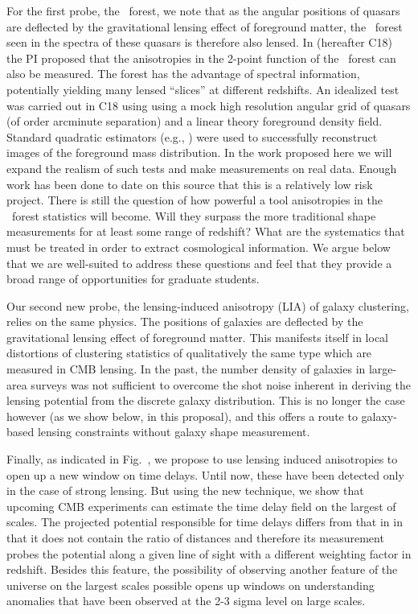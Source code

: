 For the first probe, the \lya\ forest, we note that as the angular 
positions of quasars are deflected by the 
gravitational lensing effect of foreground matter, the \lya\ forest 
seen in the spectra of these quasars is 
therefore also lensed.
In \cite{croft17} (hereafter C18)
 the PI proposed that the 
anisotropies in the 2-point function of the \lya\ forest
can also be measured.
The forest has the advantage of spectral information,
potentially yielding many lensed ``slices'' at different redshifts.
An idealized test was carried out in C18 using
using a mock  high resolution angular grid of quasars (of order arcminute separation) and a linear theory foreground density
field. Standard quadratic estimators (e.g., \cite{okamoto})  
were used to successfully  reconstruct images of the foreground mass 
distribution. In the work proposed here we will expand the realism
of such tests and make measurements on real data. Enough work has been done to date on this source that this is a relatively low risk
project. There is still the question of how powerful a tool anisotropies in the \lya\ forest statistics will become. Will they surpass the more traditional shape measurements for at least some range of redshift? What are the systematics that must be treated in order to extract cosmological information. We argue below that we are well-suited to address these questions and feel that they provide a broad range of opportunities for graduate students.

Our second new probe, the lensing-induced  anisotropy (LIA) 
of galaxy clustering,
relies on the same physics. The positions
of galaxies are deflected by the gravitational lensing effect of
foreground matter. This manifests itself in local distortions of
clustering statistics of qualitatively 
the same type which are measured in CMB lensing.
In the past, the number density of galaxies in large-area surveys 
was not sufficient to overcome the shot noise inherent in deriving
the lensing potential from the discrete galaxy distribution. This is
no longer the case however (as we show below, in this proposal), and
this offers a route to galaxy-based lensing constraints without
galaxy shape measurement.

Finally, as indicated in Fig.~, we propose to use lensing induced anisotropies to open up a new window on time delays. Until now, these have been detected only in the case of strong lensing. But using the new technique, we show that upcoming CMB experiments can estimate the time delay field on the largest of scales. The projected potential responsible for time delays differs from that in  in that it does not contain the ratio of distances and therefore its measurement probes the potential along a given line of sight with a different weighting factor in redshift. Besides this feature, the possibility of observing another feature of the universe on the largest scales possible opens up windows on understanding anomalies that have been observed at the 2-3 sigma level on large scales. 


